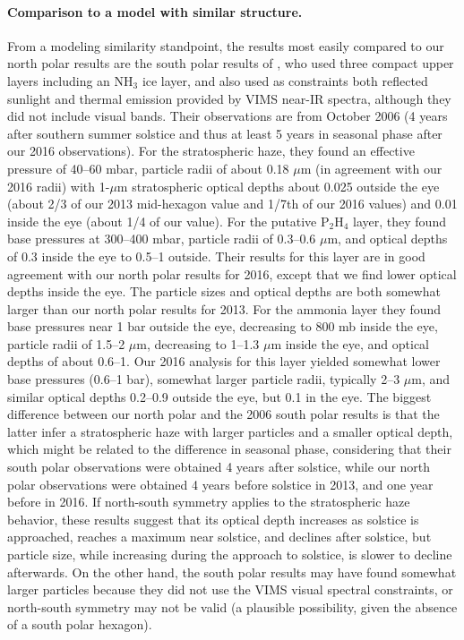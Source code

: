 \documentclass[article,11pt]{emulateapj}
\def\mum{$\mu$m }
\def\mumx{$\mu$m}
\def\pthf{P$_2$H$_4$ }
\def\nht{NH$_3$ }
\begin{document}
\paragraph{Comparison to a model with similar structure. }  From a modeling similarity standpoint, 
the results most easily compared to our north polar results are the south
polar results of \cite{Sro2020spole}, who used three compact upper
layers including an \nht ice layer, and also used as constraints both
reflected sunlight and thermal emission provided by VIMS near-IR
spectra, although they did not include visual bands.  Their observations
are from October 2006 (4 years after southern summer solstice and thus
at least 5 years in seasonal phase after our 2016 observations).  For the
stratospheric haze, they found an effective pressure of 40--60 mbar,
particle radii of about 0.18 \mum (in agreement with our 2016 radii)
with 1-\mum stratospheric optical depths about 0.025 outside the eye
(about 2/3 of our 2013 mid-hexagon value and 1/7th of our 2016 values)
and 0.01 inside the eye (about 1/4 of our value).  For the putative
\pthf layer, they found base pressures at 300--400 mbar, particle
radii of 0.3--0.6 \mumx, and optical depths of 0.3 inside the eye to
0.5--1 outside. Their results for this layer are in good agreement
with our north polar results for 2016, except that we find lower optical depths
inside the eye. The particle sizes and optical depths
are both somewhat larger than our north polar results for 2013.
 For the ammonia layer they found base pressures near 1
bar outside the eye, decreasing to 800 mb inside the eye, particle
radii of 1.5--2 \mumx, decreasing to 1--1.3 \mum inside the eye, and
optical depths of about 0.6--1.  Our 2016 analysis for this layer
yielded somewhat lower base pressures (0.6--1 bar), somewhat larger
particle radii, typically 2--3 \mumx, and similar optical depths
0.2--0.9 outside the eye, but 0.1 in the eye.  The biggest difference
between our north polar and the 2006 south polar results is that the
latter infer a stratospheric haze with larger particles and a smaller
optical depth, which might be related to the difference in seasonal
phase, considering that their south polar observations were obtained 4
years after solstice, while our north polar observations were obtained
4 years before solstice in 2013, and one year before in 2016.  If
north-south symmetry applies to the stratospheric haze behavior, these
results suggest that its optical depth increases as solstice is
approached, reaches a maximum near solstice, and declines after
solstice, but particle size, while increasing during the approach to
solstice, is slower to decline afterwards. On the other hand, the
south polar results may have found somewhat larger particles because
they did not use the VIMS visual spectral constraints, or north-south
symmetry may not be valid (a plausible possibility, given the absence
of a south polar hexagon).
\end{document}
